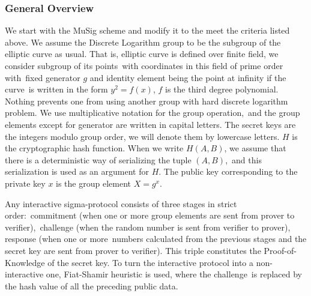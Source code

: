 \subsubsection{General Overview}

We start with the MuSig scheme and modify it to the meet the criteria listed above.
We assume the Discrete Logarithm group to be the subgroup of the elliptic curve as usual.
That is, elliptic curve is defined over finite field, we consider subgroup of its points\
with coordinates in this field of prime order with\
fixed generator $g$ and identity element being the point at infinity if the curve\
is written in the form ${y^2=f(x)}$, $f$ is the third degree polynomial.
Nothing prevents one from using another group with hard discrete logarithm problem.
We use multiplicative notation for the group operation,\
and the group elements except for generator are written in capital letters.
The secret keys are the integers modulo group order, we will denote them by lowercase letters.
$H$ is the cryptographic hash function.
When we write ${H(A,B)}$, we assume that there is a deterministic way of serializing the tuple ${(A,B)}$,\
and this serialization is used as an argument for $H$.
The public key corresponding to the private key $x$ is the group element ${X=g^x}$.

Any interactive sigma-protocol consists of three stages in strict order:\
commitment (when one or more group elements are sent from prover to verifier),\
challenge (when the random number is sent from verifier to prover), response (when one or more\
numbers calculated from the previous stages and the secret key are sent from prover to verifier).
This triple constitutes the Proof-of-Knowledge of the secret key.
To turn the interactive protocol into a non-interactive one, Fiat-Shamir heuristic is used, where the challenge\
is replaced by the hash value of all the preceding public data.

